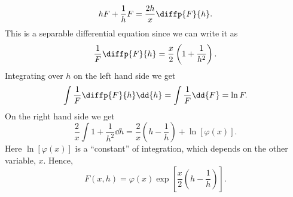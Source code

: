 \documentclass[fleqn]{NotesClass}
\begin{document}
    \begin{equation}
        hF + \frac{1}{h}F = \frac{2h}{x}\diffp{F}{h}.
    \end{equation}
    This is a separable differential equation since we can write it as
    \begin{equation}
        \frac{1}{F} \diffp{F}{h} = \frac{x}{2} \left( 1 + \frac{1}{h^2} \right).
    \end{equation}
    Integrating over \(h\) on the left hand side we get
    \begin{equation}
        \int \frac{1}{F} \diffp{F}{h} \dd{h} = \int \frac{1}{F} \dd{F} = \ln F.
    \end{equation}
    On the right hand side we get
    \begin{equation}
        \frac{2}{x} \int 1 + \frac{1}{h^2} \dd{h} = \frac{2}{x}\left( h - \frac{1}{h} \right) + \ln[\varphi(x)].
    \end{equation}
    Here \(\ln[\varphi(x)]\) is a \enquote{constant} of integration, which depends on the other variable, \(x\).
    Hence,
    \begin{equation}\label{eqn:bessel generating function derivation}
        F(x, h) = \varphi(x) \exp\left[ \frac{x}{2}\left( h - \frac{1}{h} \right) \right].
    \end{equation}
    
\end{document}
